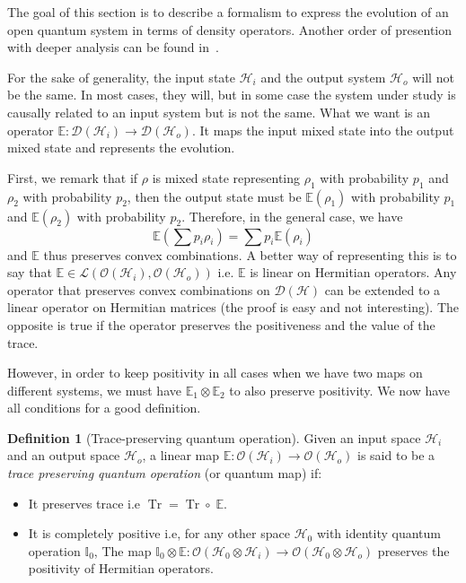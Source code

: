 \documentclass[10pt,a4paper]{report}
\theoremstyle{plain}
\theoremstyle{definition}
\newtheorem{defn}{Definition}[chapter]
\theoremstyle{remark}
\DeclareMathOperator{\Tr}{Tr}
\begin{document}
The goal of this section is to describe a formalism to express the evolution of
an open quantum system in terms of density operators. Another order of presention
with deeper analysis can be found in~\cite{QCQI}.

For the sake of generality, the input state
$\mathcal{H}_i$ and the output system $\mathcal{H}_o$ will not be the same. In
most cases, they will, but in some case the system under study is causally related to
an input system but is not the same.
What we want is an operator $\mathbb{E} : \mathcal{D}(\mathcal{H}_i) \to
\mathcal{D}(\mathcal{H}_o)$. It maps the input mixed state into the output mixed
state and represents the evolution.

First, we remark that if $\rho$ is mixed state representing $\rho_1$ with
probability $p_1$ and $\rho_2$ with probability $p_2$, then the output state
must be $\mathbb E(\rho_1)$ with probability $p_1$ and $\mathbb E(\rho_2)$ with
probability $p_2$. Therefore, in the general case, we have
\[\mathbb E(\sum p_i \rho_i) = \sum p_i \mathbb E(\rho_i)\]
and $\mathbb E$ thus preserves convex combinations. A better way of representing
this is to say that $\mathbb E \in
\mathcal{L}(\mathcal{O}(\mathcal{H}_i),\mathcal{O}(\mathcal{H}_o))$ i.e.
$\mathbb{E}$ is linear on Hermitian operators. Any operator that preserves
convex combinations on $\mathcal{D}(\mathcal{H})$ can be extended to a linear
operator on Hermitian matrices (the proof is easy and not interesting). The
opposite is true if the operator preserves the positiveness and the value of the
trace.

However, in order to keep positivity in all cases when we have two maps on
different systems, we must have $\mathbb{E}_1
\otimes \mathbb{E}_2$ to also preserve positivity. We now have all
conditions for a good definition.

\begin{defn}[Trace-preserving quantum operation]\label{def:tpqo}
  Given an input space $\mathcal{H}_i$ and an output space $\mathcal{H}_o$, a
  linear map $\mathbb E : \mathcal{O}(\mathcal{H}_i) \to
  \mathcal{O}(\mathcal{H}_o)$ is said to be a \emph{trace preserving quantum
    operation} (or quantum map) if:
  \begin{itemize}
  \item It preserves trace i.e $\Tr = \Tr \circ\; \mathbb E$.
  \item It is completely positive i.e, for any other space $\mathcal{H}_0$ with
    identity quantum operation $\mathbb I_0$, The map $\mathbb I_0 \otimes
    \mathbb E : \mathcal{O}(\mathcal{H}_0 \otimes \mathcal{H}_i) \to
    \mathcal{O}(\mathcal{H}_0 \otimes \mathcal{H}_o)$ preserves the positivity
    of Hermitian operators.
  \end{itemize}
\end{defn}
\end{document}
